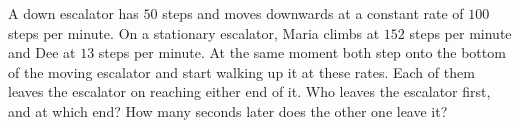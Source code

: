 A down escalator has $50$ steps and moves downwards at a constant rate of $100$ steps per minute. On a stationary escalator, Maria climbs at $152$ steps per minute and Dee at $13$ steps per minute. At the same moment both step onto the bottom of the moving escalator and start walking up it at these rates. Each of them leaves the escalator on reaching either end of it. Who leaves the escalator first, and at which end? How many seconds later does the other one leave it?
